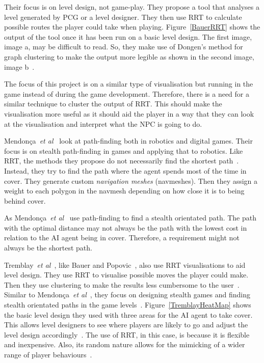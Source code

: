 \documentclass[journal]{IEEEtran}
\begin{document}
	Their focus is on level design, not game-play. They propose a tool that analyses a level generated by PCG or a level designer. They then use RRT to calculate possible routes the player could take when playing.  Figure~\ref{BauerRRT} shows the output of the tool once it has been run on a basic level design.  The first image, image a, may be difficult to read. So, they make use of Dongen's method for graph clustering to make the output more legible as shown in the second image, image b~\cite{bauer2012, Dongen2001}.  
	
	The focus of this project is on a similar type of visualisation but running in the game instead of during the game development. Therefore, there is a need for a similar technique to cluster the output of RRT. This should make the visualisation more useful as it should aid the player in a way that they can look at the visualisation and interpret what the NPC is going to do. 
	
	Mendonça~\textit{et al}~\cite{Mendonça2015} look at path-finding both in robotics and digital games. Their focus is on stealth path-finding in games and applying that to robotics. Like RRT, the methods they propose do not necessarily find the shortest path~\cite{karaman2010, Mendonça2015}. Instead, they try to find the path where the agent spends most of the time in cover. They generate custom \textit{navigation meshes} (navmeshes). Then they assign a weight to each polygon in the navmesh depending on how close it is to being behind cover. 
	
	As Mendonça~\textit{et al}~\cite{Mendonça2015} use path-finding to find a stealth orientated path. The path with the optimal distance may not always be the path with the lowest cost in relation to the AI agent being in cover. Therefore, a requirement might not always be the shortest path. 
	
	Tremblay~\textit{et al}~\cite{Tremblay2013}, like Bauer and Popovic~\cite{bauer2012}, also use RRT visualisations to aid level design. They use RRT to visualise possible moves the player could make. Then they use clustering to make the results less cumbersome to the user~\cite{Tremblay2013}. Similar to Mendonça~\textit{et al}~\cite{Mendonça2015}, they focus on designing stealth games and finding stealth orientated paths in the game levels~\cite{Tremblay2013}.   Figure~\ref{TremblayHeatMap} shows the basic level design they used with three areas for the AI agent to take cover. This allows level designers to see where players are likely to go and adjust the level design accordingly~\cite{Tremblay2013}.  The use of RRT, in this case, is because it is flexible and inexpensive. Also, its random nature allows for the mimicking of a wider range of player behaviours~\cite{Tremblay2013}. 
	
\end{document}
